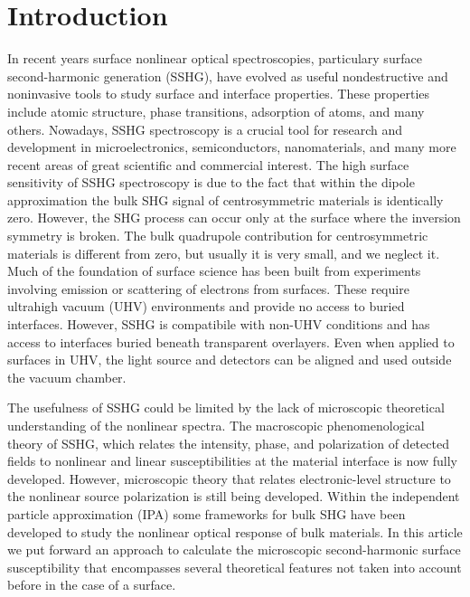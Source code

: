 \documentclass[floatfix,prb,aps,superscriptaddress,showpacs,11pt,preprint,letterpaper]{revtex4}
\begin{document}
\maketitle

\section{Introduction}\label{intro}

In recent years surface nonlinear optical spectroscopies, particulary surface 
second-harmonic generation (SSHG), have evolved as useful nondestructive 
and noninvasive tools to study surface and interface properties. These 
properties include atomic structure, phase transitions, adsorption of 
atoms, and many others.\cite{daumPRL93, mcgilpOE94, meyerPRL95, powerPRL95, 
godefroyAPL96, hoferAPA96, dadapPRB97, bloembergenAPB99, mcgilpSRL99, 
suzukiAPB99, mitchellSS01, hughesPRB96, guyotPRB88, downerPSSA01, shenAPB99, 
shenNAT89, chenPRL81, mendozaPRL98, downerSIA01} Nowadays, SSHG spectroscopy 
is a crucial tool for research and development in microelectronics,
\cite{zheltikovLP00} semiconductors, \cite{lupkeSSR99} nanomaterials,
\cite{salazar-aparicioPRB14} and many more recent areas of great scientific 
and commercial interest.\cite{cazzanelliNM14} The high surface sensitivity 
of SSHG spectroscopy is due to the fact that within the dipole approximation 
the bulk SHG signal of centrosymmetric materials is identically zero.
However, the SHG process  
can occur only   
at the surface where the inversion symmetry is   
broken.   
The bulk quadrupole contribution for centrosymmetric materials is
different from zero, but usually it is very small,\cite{downerSIA01} and we neglect it. 
Much of the foundation of surface science has been built from 
experiments involving emission or scattering of electrons from surfaces. 
These require ultrahigh vacuum (UHV) environments and provide no access to 
buried interfaces. However, SSHG is compatibile with non-UHV conditions and 
has access to interfaces buried beneath transparent overlayers. Even when 
applied to surfaces in UHV, the light source and detectors can be aligned and
used outside the vacuum chamber. 

The usefulness of SSHG could be limited by the lack of microscopic theoretical
understanding of the nonlinear spectra. The macroscopic phenomenological 
theory of SSHG, which relates the intensity, phase, and polarization of 
detected fields to nonlinear and linear susceptibilities at the material 
interface is now fully developed.\cite{downerSIA01}
 However, microscopic theory that relates 
electronic-level structure to the nonlinear source polarization is still being 
developed. \cite{butcherPOPS63, aspnesPRB72, sipePRB93,
  levinePRB94,aversaPRB95, hughesPRB96, rashkeevPRB98,beyond}  
 Within the independent 
particle approximation (IPA) some frameworks for bulk SHG have been developed 
to study the nonlinear optical response of bulk materials. \cite{butcherPOPS63, aspnesPRB72, sipePRB93, levinePRB94,aversaPRB95, hughesPRB96, rashkeevPRB98} 
In this article we put forward an approach to calculate the
microscopic second-harmonic surface susceptibility that encompasses several
theoretical features not taken into account before 
in the case of a surface.
\end{document}
